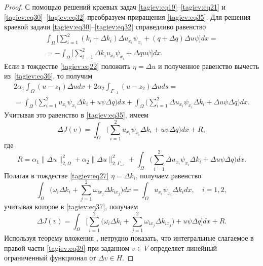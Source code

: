 \begin{proof}
С помощью решений краевых задач \eqref{tagiev:eq19}--\eqref{tagiev:eq21} и \eqref{tagiev:eq30}--\eqref{tagiev:eq32} преобразуем приращения \eqref{tagiev:eq35}. 
Для решения краевой задачи \eqref{tagiev:eq30}--\eqref{tagiev:eq32} справедливо равенство
\begin{multline}
\label{tagiev:eq36}
\int _\Omega \biggl [\sum\limits_{i=1}^2  (k_i +\Delta k_i)\Delta u_{x_i } \psi _{x_i } + (q+\Delta q)
\Delta u\psi \biggr]dx=\\
=-\int _\Omega \biggl[\sum\limits_{i=1}^2 \Delta k_i 
u_{x_i } \psi _{x_i } +\Delta qu\psi \biggr]dx.
\end{multline}
Если в тождестве \eqref{tagiev:eq22} положить $\eta =\Delta u$ и полученное равенство вычесть 
из~\eqref{tagiev:eq36}, то получим 
\begin{multline*}
2\alpha _1 \int _\Omega (u-z_1 ) \Delta u dx+2\alpha _2  \int _{\Gamma _{-1} }  (u-z_2 )\Delta uds=\\
=\int _\Omega \biggl(\sum\limits_{i=1}^2 u_{x_i } \psi _{x_i }  \Delta k_i +u\psi \Delta q \biggr) dx
 +\int _\Omega \biggl( \sum\limits_{i=1}^2 \Delta u_{x_i } \psi 
_{x_i } \Delta k_i +\Delta u\psi \Delta q \biggr)dx. 
\end{multline*}
Учитывая это равенство в \eqref{tagiev:eq35}, имеем 
\begin{equation}
\label{tagiev:eq37}
\Delta J (  v  )=\int _\Omega \biggl(\sum\limits_{i=1}^2 
u_{x_i } \psi _{x_i } \Delta k_i +u\psi \Delta q \biggr)dx+R,
\end{equation}
где 
\begin{equation}
\label{tagiev:eq38}
R=\alpha _1 \| \Delta u\|_{2,\Omega }^2 +\alpha _2 \| 
\Delta u \|_{2,\Gamma _{-1}}^2 +\int _\Omega 
\biggl(\sum\limits_{i=1}^2 \Delta u_{x_i} \psi _{x_i } \Delta k_i +\Delta u\psi 
\Delta q \biggr) dx.
\end{equation}
Полагая в тождестве \eqref{tagiev:eq27} $\eta =\Delta k_i$, получаем равенство
\[
\int _\Omega \biggl(\omega _i \Delta k_i +\sum\limits_{j=1}^2 \omega 
_{i x_j} \Delta k_{ix_j} \biggr)dx  =\int _\Omega u_{x_i } \psi _{x_i } 
\Delta k_i dx,  \quad i=1,2,
\]
учитывая которое в \eqref{tagiev:eq37}, получаем
\begin{equation}
\label{tagiev:eq39}
\Delta J (  v  )=\int _\Omega 
\biggl[\sum\limits_{i=1}^2 \biggl(\omega _i \Delta k_i +\sum\limits_{j=1}^2 
\omega _{ix_j } \Delta k_{ix_j } \biggr)+u\psi \Delta q \biggr]dx + R.
\end{equation}
Используя теорему вложения \cite[c.~84]{tagiev:bib15}, нетрудно показать, что интегральные 
слагаемое в правой части \eqref{tagiev:eq39} при заданном $ v  \in V$ определяет 
линейный ограниченный функционал от $\Delta  v  \in H$.




\end{proof}
